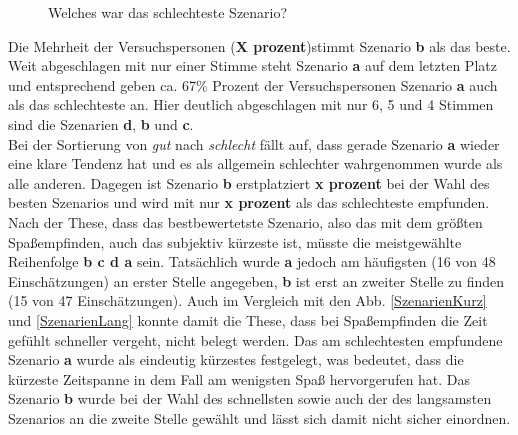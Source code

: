 \documentclass{Paper}
\begin{document}
       
       
        \begin{figure}[ht]
\caption{Welches war das schlechteste Szenario?}
\label{SzenarioSchlecht}
\end{figure}


       Die Mehrheit der Versuchspersonen (\textbf{X prozent})stimmt Szenario \textbf{b} als das beste. Weit abgeschlagen mit nur einer Stimme steht Szenario \textbf{a} auf dem letzten Platz und entsprechend geben ca. 67\% Prozent der Versuchspersonen Szenario \textbf{a} auch als das schlechteste an. Hier deutlich abgeschlagen mit nur 6, 5 und 4 Stimmen sind die Szenarien \textbf{d}, \textbf{b} und \textbf{c}.\\
Bei der Sortierung von \textit{gut} nach \textit{schlecht} fällt auf, dass gerade Szenario \textbf{a} wieder eine klare Tendenz hat und es als allgemein schlechter wahrgenommen wurde als alle anderen. Dagegen ist Szenario \textbf{b} erstplatziert \textbf{x prozent} bei der Wahl des besten Szenarios und wird mit nur \textbf{x prozent} als das schlechteste empfunden.\\
Nach der These, dass das bestbewertetste Szenario, also das mit dem größten Spaßempfinden, auch das subjektiv kürzeste ist, müsste die meistgewählte Reihenfolge \textbf{b c d a} sein. Tatsächlich wurde \textbf{a} jedoch am häufigsten (16 von 48 Einschätzungen) an erster Stelle angegeben, \textbf{b} ist erst an zweiter Stelle zu finden (15 von 47 Einschätzungen).  Auch im Vergleich mit den Abb. \ref{SzenarienKurz} und \ref{SzenarienLang} konnte damit die These, dass bei Spaßempfinden die Zeit gefühlt schneller vergeht, nicht belegt werden. Das am schlechtesten empfundene Szenario \textbf{a} wurde als eindeutig kürzestes festgelegt, was bedeutet, dass die kürzeste Zeitspanne in dem Fall am wenigsten Spaß hervorgerufen hat. Das Szenario \textbf{b} wurde bei der Wahl des schnellsten sowie auch der des langsamsten Szenarios an die zweite Stelle gewählt und lässt sich damit nicht sicher einordnen.\\
\end{document}
